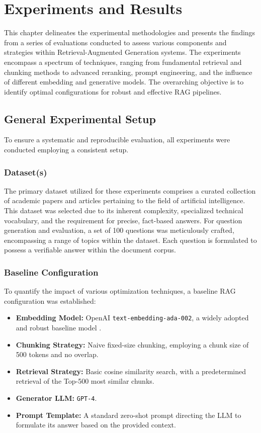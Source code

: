 \chapter{Experiments and Results}
\label{chap:experiments_results}

This chapter delineates the experimental methodologies and presents the findings from a series of evaluations conducted to assess various components and strategies within Retrieval-Augmented Generation systems. The experiments encompass a spectrum of techniques, ranging from fundamental retrieval and chunking methods to advanced reranking, prompt engineering, and the influence of different embedding and generative models. The overarching objective is to identify optimal configurations for robust and effective RAG pipelines.

\section{General Experimental Setup}
\label{sec:general_setup}
To ensure a systematic and reproducible evaluation, all experiments were conducted employing a consistent setup.

\subsection{Dataset(s)}
The primary dataset utilized for these experiments comprises a curated collection of academic papers and articles pertaining to the field of artificial intelligence. This dataset was selected due to its inherent complexity, specialized technical vocabulary, and the requirement for precise, fact-based answers. For question generation and evaluation, a set of 100 questions was meticulously crafted, encompassing a range of topics within the dataset. Each question is formulated to possess a verifiable answer within the document corpus.

\subsection{Baseline Configuration}
To quantify the impact of various optimization techniques, a baseline RAG configuration was established:
\begin{itemize}
    \item \textbf{Embedding Model:} OpenAI \texttt{text-embedding-ada-002}, a widely adopted and robust baseline model \autocite{openai2022ada002}.
    \item \textbf{Chunking Strategy:} Naive fixed-size chunking, employing a chunk size of 500 tokens and no overlap.
    \item \textbf{Retrieval Strategy:} Basic cosine similarity search, with a predetermined retrieval of the Top-500 most similar chunks.
    \item \textbf{Generator LLM:} \texttt{GPT-4}.
    \item \textbf{Prompt Template:} A standard zero-shot prompt directing the LLM to formulate its answer based on the provided context.
\end{itemize}

